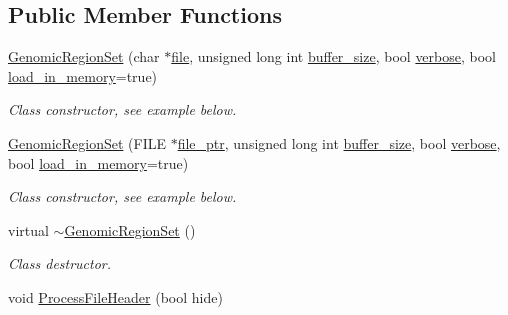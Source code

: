 \subsection*{Public Member Functions}
\begin{CompactItemize}
\item 
\hypertarget{classGenomicRegionSet_afc417b2a9a27f3ad833828be5720e92}{
\hyperlink{classGenomicRegionSet_afc417b2a9a27f3ad833828be5720e92}{GenomicRegionSet} (char $\ast$\hyperlink{classGenomicRegionSet_7c593d1beab775590d5b810097644583}{file}, unsigned long int \hyperlink{classGenomicRegionSet_4d60b5403d2d6aaeda541ed45625b245}{buffer\_\-size}, bool \hyperlink{classGenomicRegionSet_2646e9e6d5da1693b4bea36a5acc082e}{verbose}, bool \hyperlink{classGenomicRegionSet_de43c6cd72b95da75395129b00a52687}{load\_\-in\_\-memory}=true)}
\label{classGenomicRegionSet_afc417b2a9a27f3ad833828be5720e92}

\begin{CompactList}\small\item\em Class constructor, see example below. \item\end{CompactList}\item 
\hypertarget{classGenomicRegionSet_8d18f09bd536bae9f2a2494d4cc19f65}{
\hyperlink{classGenomicRegionSet_8d18f09bd536bae9f2a2494d4cc19f65}{GenomicRegionSet} (FILE $\ast$\hyperlink{classGenomicRegionSet_4ca6c6268e39fdea2add6e6381c66962}{file\_\-ptr}, unsigned long int \hyperlink{classGenomicRegionSet_4d60b5403d2d6aaeda541ed45625b245}{buffer\_\-size}, bool \hyperlink{classGenomicRegionSet_2646e9e6d5da1693b4bea36a5acc082e}{verbose}, bool \hyperlink{classGenomicRegionSet_de43c6cd72b95da75395129b00a52687}{load\_\-in\_\-memory}=true)}
\label{classGenomicRegionSet_8d18f09bd536bae9f2a2494d4cc19f65}

\begin{CompactList}\small\item\em Class constructor, see example below. \item\end{CompactList}\item 
\hypertarget{classGenomicRegionSet_3fc7c6dc31cffcedf97a7b69a7f3c2c8}{
virtual \hyperlink{classGenomicRegionSet_3fc7c6dc31cffcedf97a7b69a7f3c2c8}{$\sim$GenomicRegionSet} ()}
\label{classGenomicRegionSet_3fc7c6dc31cffcedf97a7b69a7f3c2c8}

\begin{CompactList}\small\item\em Class destructor. \item\end{CompactList}\item 
\hypertarget{classGenomicRegionSet_6992ccc0c4dd8be0ad4be9b991ab9f36}{
void \hyperlink{classGenomicRegionSet_6992ccc0c4dd8be0ad4be9b991ab9f36}{ProcessFileHeader} (bool hide)}
\label{classGenomicRegionSet_6992ccc0c4dd8be0ad4be9b991ab9f36}


\end{CompactItemize}
